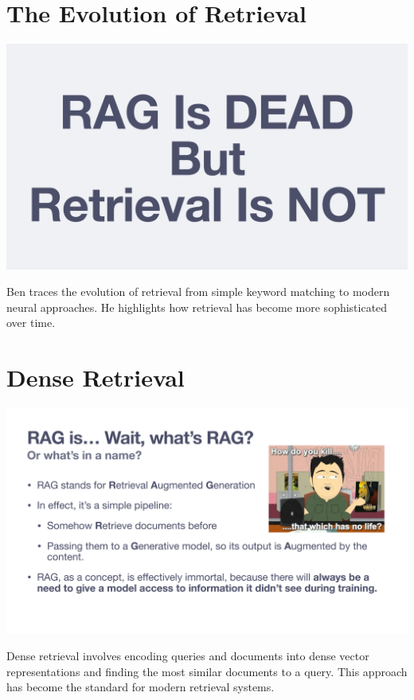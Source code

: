 \documentclass[
  letterpaper,
  oneside]{scrbook}
\begin{document}
\section{The Evolution of Retrieval}\label{the-evolution-of-retrieval}

\includegraphics{chapters/../p1-images/slide_4.png}

Ben traces the evolution of retrieval from simple keyword matching to
modern neural approaches. He highlights how retrieval has become more
sophisticated over time.

\section{Dense Retrieval}\label{dense-retrieval}

\includegraphics{chapters/../p1-images/slide_5.png}

Dense retrieval involves encoding queries and documents into dense
vector representations and finding the most similar documents to a
query. This approach has become the standard for modern retrieval
systems.
\end{document}

